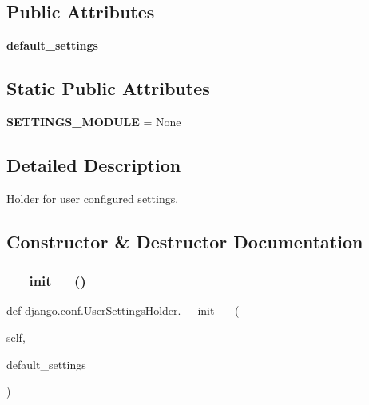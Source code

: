 \subsection*{Public Attributes}
\begin{DoxyCompactItemize}
\item 
\mbox{\label{classdjango_1_1conf_1_1_user_settings_holder_a8227a4f0e0c1148d06a96b69ba2a9232}} 
{\bfseries default\+\_\+settings}
\end{DoxyCompactItemize}
\subsection*{Static Public Attributes}
\begin{DoxyCompactItemize}
\item 
\mbox{\label{classdjango_1_1conf_1_1_user_settings_holder_af53688bc1acb0d0f23fafb746528f1b3}} 
{\bfseries S\+E\+T\+T\+I\+N\+G\+S\+\_\+\+M\+O\+D\+U\+LE} = None
\end{DoxyCompactItemize}


\subsection{Detailed Description}
\begin{DoxyVerb}Holder for user configured settings.\end{DoxyVerb}
 

\subsection{Constructor \& Destructor Documentation}
\mbox{\label{classdjango_1_1conf_1_1_user_settings_holder_a3941aa8a3dfa09eaedf88bdf0e00f08f}} 
\subsubsection{\texorpdfstring{\+\_\+\+\_\+init\+\_\+\+\_\+()}{\_\_init\_\_()}}
{\footnotesize\ttfamily def django.\+conf.\+User\+Settings\+Holder.\+\_\+\+\_\+init\+\_\+\+\_\+ (\begin{DoxyParamCaption}\item[{}]{self,  }\item[{}]{default\+\_\+settings }\end{DoxyParamCaption})}

